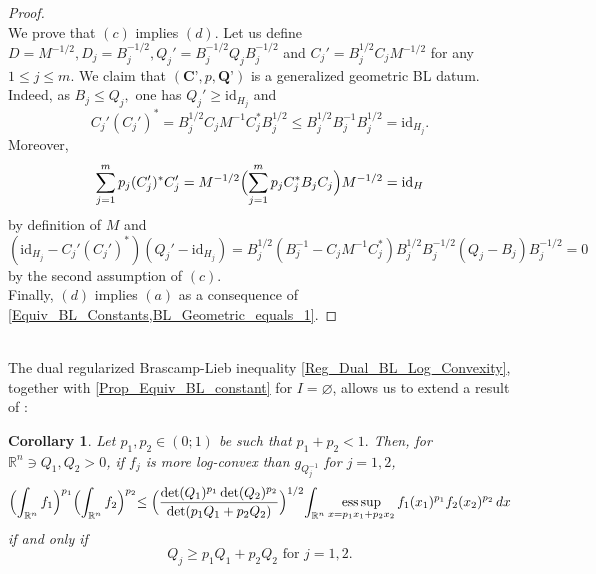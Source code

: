 \documentclass[11pt,a4paper,reqno]{amsart}
\numberwithin{equation}{section}
\DeclareMathOperator*{\esssup}{ess\,sup}
\newtheorem{corollary}[theorem]{Corollary}
\theoremstyle{definition}
\newcommand{\<}{\ensuremath \leq}
\renewcommand{\>}{\ensuremath \geq}
\let\emptyset\varnothing
\begin{document}
\begin{proof}
    \hfill \\ We prove that $(c)$ implies $(d)$. Let us define $D=M^{-1/2}, D_j=B_j^{-1/2}, Q_j'=B_j^{-1/2}Q_jB_j^{-1/2}$ and $C_j'=B_j^{1/2}C_jM^{-1/2}$ for any $1 \leq j \leq m.$ We claim that $(\textbf{C'},p,\textbf{Q'})$ is a generalized geometric BL datum. Indeed, as $B_j \leq Q_j,$ one has $Q_j' \geq \mathrm{id}_{H_j}$ and $$C_j'(C_j')^*=B_j^{1/2}C_jM^{-1}C_j^*B_j^{1/2} \leq B_j^{1/2}B_j^{-1}B_j^{1/2}=\mathrm{id}_{H_j}.$$ Moreover, $$\sum_{j=1}^m p_j(C_j')^*C_j'=M^{-1/2}\Bigl(\sum_{j=1}^m p_jC_j^*B_jC_j\Bigl)M^{-1/2}=\mathrm{id}_H$$ by definition of $M$ and $$(\mathrm{id}_{H_j}-C_j'(C_j')^*)(Q_j'-\mathrm{id}_{H_j})=B_j^{1/2}(B_j^{-1}-C_jM^{-1}C_j^*)B_j^{1/2}B_j^{-1/2}(Q_j-B_j)B_j^{-1/2}=0$$ by the second assumption of $(c).$ \\ Finally, $(d)$ implies $(a)$ as a consequence of \cref{Equiv_BL_Constants,BL_Geometric_equals_1}. 
\end{proof}

\hfill \\



The dual regularized Brascamp-Lieb inequality \cref{Reg_Dual_BL_Log_Convexity}, together with \cref{Prop_Equiv_BL_constant} for $I=\emptyset$, allows us to extend a result of \cite[Section 6.2]{Nakamura}:

\begin{corollary}
Let $p_1,p_2 \in (0;1)$ be such that $p_1+p_2<1.$ Then, for $\mathbb{R}^n \ni Q_1,Q_2>0$, if $f_j$ is more log-convex than $g_{Q_j^{-1}}$ for $j=1,2$, $$\Bigl(\int_{\mathbb{R}^n}f_1\Bigl)^{p_1}\Bigl( \int_{\mathbb{R}^n}f_2\Bigl)^{p_2} \leq  \Bigl( \frac{\det(Q_1)^{p_1}\det(Q_2)^{p_2}}{\det(p_1Q_1+p_2Q_2)}\Bigl)^{1/2}\int_{\mathbb{R}^n}\esssup_{x=p_1x_1+p_2x_2}f_1(x_1)^{p_1}f_2(x_2)^{p_2}\, dx$$ if and only if $$Q_j \geq p_1Q_1+p_2Q_2 \text{ for } j=1,2.$$ 
\end{corollary}

\bigskip
\end{document}
